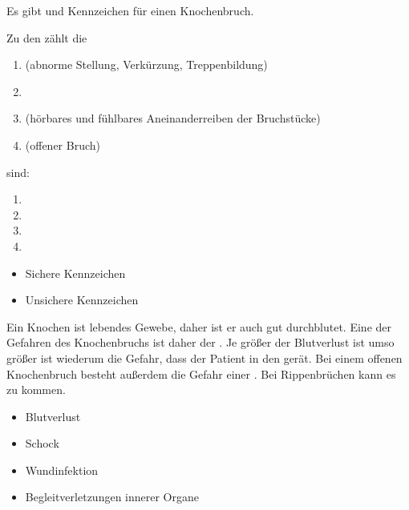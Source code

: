 {
Es gibt  und  Kennzeichen für einen Knochenbruch. 

Zu
den  zählt die 

\begin{enumerate}
  \item {} (abnorme Stellung,
  Verkürzung, Treppenbildung)
  \item {}
  \item {} 
  (hörbares und fühlbares Aneinanderreiben der Bruchstücke)
  \item {} (offener Bruch)
\end{enumerate}



sind:

\begin{enumerate}
  \item {} 
  \item {}
  \item {} 
  \item {}
\end{enumerate}


}{
\begin{itemize}
    \item Sichere Kennzeichen
    \item Unsichere Kennzeichen
\end{itemize}
}{}{}{}

\TextSlide{\TxGefahren{}}
{
Ein Knochen ist lebendes
Gewebe, daher ist er auch gut durchblutet. Eine der Gefahren
des Knochenbruchs ist daher der . Je größer
der Blutverlust ist umso größer ist wiederum die Gefahr,
dass der Patient in den  gerät. Bei einem offenen
Knochenbruch besteht außerdem die Gefahr einer
. Bei Rippenbrüchen kann
es zu  kommen.
}{
\begin{itemize}
    \item Blutverlust
    \item Schock
    \item Wundinfektion
    \item Begleitverletzungen innerer Organe
\end{itemize}
}{}{}{}


